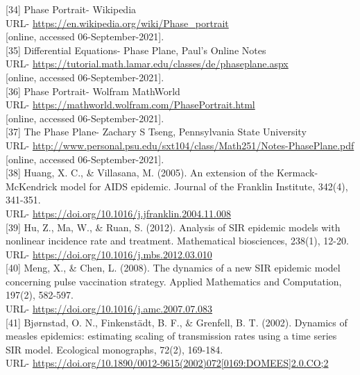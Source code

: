 [34] Phase Portrait- Wikipedia \\
URL- \url{https://en.wikipedia.org/wiki/Phase_portrait} \\
{[online, accessed 06-September-2021]}. \\

[35] Differential Equations- Phase Plane, Paul's Online Notes \\
URL- \url{https://tutorial.math.lamar.edu/classes/de/phaseplane.aspx} \\
{[online, accessed 06-September-2021]}. \\

[36] Phase Portrait- Wolfram MathWorld \\
URL- \url{https://mathworld.wolfram.com/PhasePortrait.html} \\
{[online, accessed 06-September-2021]}. \\

[37] The Phase Plane- Zachary S Tseng, Pennsylvania State University \\
URL- \url{http://www.personal.psu.edu/sxt104/class/Math251/Notes-PhasePlane.pdf} \\
{[online, accessed 06-September-2021]}. \\

[38] Huang, X. C., \& Villasana, M. (2005). An extension of the Kermack-McKendrick model for AIDS epidemic. Journal of the Franklin Institute, 342(4), 341-351. \\
URL- \url{https://doi.org/10.1016/j.jfranklin.2004.11.008} \\

[39] Hu, Z., Ma, W., \& Ruan, S. (2012). Analysis of SIR epidemic models with nonlinear incidence rate and treatment. Mathematical biosciences, 238(1), 12-20. \\
URL- \url{https://doi.org/10.1016/j.mbs.2012.03.010} \\
	
[40] Meng, X., \& Chen, L. (2008). The dynamics of a new SIR epidemic model concerning pulse vaccination strategy. Applied Mathematics and Computation, 197(2), 582-597. \\
URL- \url{https://doi.org/10.1016/j.amc.2007.07.083} \\

[41] Bj{\o}rnstad, O. N., Finkenst\"adt, B. F., \& Grenfell, B. T. (2002). Dynamics of measles epidemics: estimating scaling of transmission rates using a time series SIR model. Ecological monographs, 72(2), 169-184. \\
URL- \url{https://doi.org/10.1890/0012-9615(2002)072[0169:DOMEES]2.0.CO;2} \\

